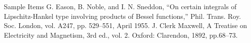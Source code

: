 \documentclass[11pt, conference]{IEEEtran}
\begin{document}

\begin{thebibliography}{00}
    Sample Items
    G. Eason, B. Noble, and I. N. Sneddon, ``On certain integrals of Lipschitz-Hankel type involving products of Bessel functions,'' Phil. Trans. Roy. Soc. London, vol. A247, pp. 529--551, April 1955.
    J. Clerk Maxwell, A Treatise on Electricity and Magnetism, 3rd ed., vol. 2. Oxford: Clarendon, 1892, pp.68--73.
   \end{thebibliography}
\end{document}
